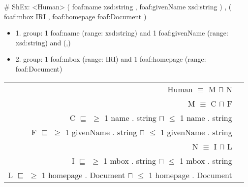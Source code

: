 \documentclass{llncs}
\newenvironment{DL}{
  \vspace{0cm}
	\begin{center}
  \begin{tabular}{r l}

}{
  \end{tabular}
	\end{center}
}
\begin{document}
\begin{ex}
# ShEx:
<Human> { 
    (  
        foaf:name xsd:string ,
        foaf:givenName xsd:string 
    ) ,
    (
        foaf:mbox IRI ,
        foaf:homepage foaf:Document
    ) }
\end{ex}

\begin{itemize}
	\item 1. group: 1 foaf:name (range: xsd:string) and 1 foaf:givenName (range: xsd:string) and (,)
	\item 2. group: 1 foaf:mbox (range: IRI) and 1 foaf:homepage (range: foaf:Document) 
\end{itemize}


\begin{DL}
Human $\equiv$ M $\sqcap$ N \\
M $\equiv$ C $\sqcap$ F \\
C $\sqsubseteq$ $\geq$ 1 name . string $\sqcap$ $\leq$ 1 name . string \\
F $\sqsubseteq$ $\geq$ 1 givenName . string $\sqcap$ $\leq$ 1 givenName . string \\
N $\equiv$ I $\sqcap$ L \\
I $\sqsubseteq$ $\geq$ 1 mbox . string $\sqcap$ $\leq$ 1 mbox . string \\
L $\sqsubseteq$ $\geq$ 1 homepage . Document $\sqcap$ $\leq$ 1 homepage . Document \\
\end{DL}
\end{document}
